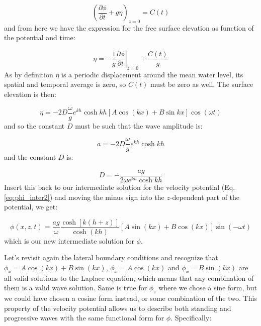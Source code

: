 \documentclass[12pt]{article}
\numberwithin{equation}{section}
\numberwithin{figure}{section}
\numberwithin{table}{section}
\begin{document}
\begin{equation}
  \left( \frac{\partial \phi}{\partial t} + g\eta \right)_{z=0} = C(t)
\end{equation}
and from here we have the expression for the free surface elevation as function
of the potential and time:

\begin{equation}
  \eta = - \frac{1}{g} \left. \frac{\partial \phi}{\partial t} \right|_{z=0} + \frac{C(t)}{g}
\end{equation}
As by definition $\eta$ is a periodic displacement around the mean water level,
its spatial and temporal average is zero, so $C(t)$ must be zero as well.
The surface elevation is then:

\begin{equation}
  \eta = - 2 D \frac{\omega}{g}e^{kh} \cosh{kh} \left[ A \cos(kx) + B \sin{kx} \right] \cos(\omega t)
  \label{eq:eta}
\end{equation}
and so the constant $D$ must be such that the wave amplitude is:

\begin{equation}
  a = - 2 D \frac{\omega}{g}e^{kh} \cosh{kh}
\end{equation}
and the constant $D$ is:

\begin{equation}
  D = - \frac{a g}{2 \omega e^{kh} \cosh{kh}}
\end{equation}
Insert this back to our intermediate solution for the velocity potential
(Eq. \ref{eq:phi_inter2}) and moving the minus sign into the $z$-dependent part
of the potential, we get:

\begin{equation}
  \phi(x, z, t) = \frac{a g}{\omega} \frac{\cosh[k(h+z)]}{\cosh(kh)} \left[ A \sin(kx) + B \cos(kx) \right] \sin(- \omega t)
\end{equation}
which is our new intermediate solution for $\phi$.

Let's revisit again the lateral boundary conditions and recognize that
$\phi_x = A \cos(kx) + B \sin(kx)$, $\phi_x = A \cos(kx)$ and $\phi_x = B \sin(kx)$
are all valid solutions to the Laplace equation, which means that any combination
of them is a valid wave solution.
Same is true for $\phi_z$ where we chose a sine form, but we could have chosen
a cosine form instead, or some combination of the two.
This property of the velocity potential allows us to describe both standing
and progressive waves with the same functional form for $\phi$.
Specifically:
\end{document}
